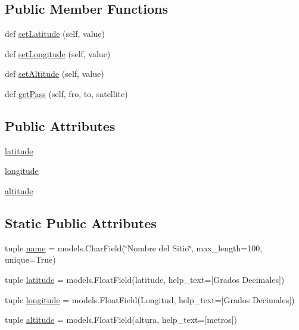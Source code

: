\subsection*{Public Member Functions}
\begin{DoxyCompactItemize}
\item 
def \hyperlink{class_ground_segment_1_1models_1_1_site_1_1_site_a8d16bf08d616c747822a06f30a4e6f68}{set\+Latitude} (self, value)
\item 
def \hyperlink{class_ground_segment_1_1models_1_1_site_1_1_site_a2b0a493e18d178fc6e66083e8bdb5ef4}{set\+Longitude} (self, value)
\item 
def \hyperlink{class_ground_segment_1_1models_1_1_site_1_1_site_a84354c833c1f25b2b212b33966a3bf54}{set\+Altitude} (self, value)
\item 
def \hyperlink{class_ground_segment_1_1models_1_1_site_1_1_site_abfd51785dc2818f3637d5847891156a4}{get\+Pass} (self, fro, to, satellite)
\end{DoxyCompactItemize}
\subsection*{Public Attributes}
\begin{DoxyCompactItemize}
\item 
\hyperlink{class_ground_segment_1_1models_1_1_site_1_1_site_ad80c609e1bc1b700cf5b7928e583233e}{latitude}
\item 
\hyperlink{class_ground_segment_1_1models_1_1_site_1_1_site_ae56f1615fe25e532349f835f2bcc2333}{longitude}
\item 
\hyperlink{class_ground_segment_1_1models_1_1_site_1_1_site_a6413a7ac28bc334b33f4b7ff9ec709c8}{altitude}
\end{DoxyCompactItemize}
\subsection*{Static Public Attributes}
\begin{DoxyCompactItemize}
\item 
tuple \hyperlink{class_ground_segment_1_1models_1_1_site_1_1_site_abeb61592ac7e77f994fc0199295aafe2}{name} = models.\+Char\+Field(\char`\"{}Nombre del Sitio\char`\"{}, max\+\_\+length=100, unique=True)
\item 
tuple \hyperlink{class_ground_segment_1_1models_1_1_site_1_1_site_ae70f374ee6697a66ad45e7fb6b753bd7}{latitude} = models.\+Float\+Field(\textquotesingle{}latitude\textquotesingle{}, help\+\_\+text=\textquotesingle{}\mbox{[}Grados Decimales\mbox{]}\textquotesingle{})
\item 
tuple \hyperlink{class_ground_segment_1_1models_1_1_site_1_1_site_a91e1633dbbd357a40d63316e779db077}{longitude} = models.\+Float\+Field(\textquotesingle{}Longitud\textquotesingle{}, help\+\_\+text=\textquotesingle{}\mbox{[}Grados Decimales\mbox{]}\textquotesingle{})
\item 
tuple \hyperlink{class_ground_segment_1_1models_1_1_site_1_1_site_a10d68a4cae29dd12f3cb610fee85a0cc}{altitude} = models.\+Float\+Field(\textquotesingle{}altura\textquotesingle{}, help\+\_\+text=\textquotesingle{}\mbox{[}metros\mbox{]}\textquotesingle{})
\end{DoxyCompactItemize}


